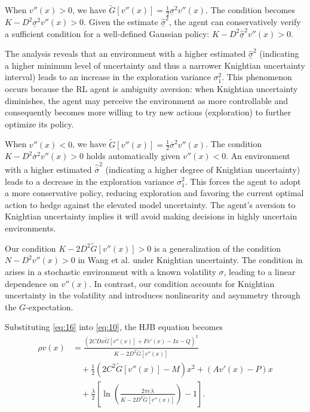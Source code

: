 \documentclass[onecolumn, journal]{IEEEtran} %
\begin{document}
	When $v''(x) > 0$, we have $\widetilde{G}[v''(x)] = \frac{1}{2} \underline{\sigma}^2 v''(x)$. The condition becomes $
	K - D^2 \underline{\sigma}^2 v''(x) > 0.$
	Given the estimate $\hat{\underline\sigma}^2$, the agent can conservatively verify a sufficient condition for a well-defined Gaussian policy: $
	K - D^2 \hat{\underline\sigma}^2v''(x) > 0.$
	
	The analysis reveals that an environment with a higher estimated $\hat{\underline\sigma}^2$ (indicating a higher minimum level of uncertainty and thus a narrower Knightian uncertainty interval) leads to an increase in the exploration variance $\sigma_1^2$. This phenomenon occurs because
	the RL agent is ambiguity aversion: when Knightian uncertainty
	diminishes, the agent may perceive the environment as
	more controllable and consequently becomes more willing to
	try new actions (exploration) to further optimize its policy.
	
	When $v''(x) < 0$, we have $\widetilde{G}[v''(x)] = \frac{1}{2} \overline{\sigma}^2 v''(x)$. The condition $ K - D^2 \overline{\sigma}^2 v''(x) > 0 $ holds automatically given $ v''(x) < 0 $. An environment with a higher estimated $\hat{\overline\sigma}^2$ (indicating a higher degree of Knightian uncertainty) leads to a decrease in the exploration variance $\sigma_1^2$. This forces the agent to adopt a more conservative policy, reducing exploration and favoring the current optimal action to hedge against the elevated model uncertainty. The agent’s aversion to Knightian uncertainty implies it will avoid making decisions in highly uncertain environments.
	
	Our condition $K - 2D^2 \widetilde{G}[v''(x)] > 0$ is a generalization of the condition $N - D^2 v''(x) > 0$ in Wang et al. \cite{wang2020reinforcement} under Knightian uncertainty. The condition in \cite{wang2020reinforcement} arises in a stochastic environment with a known volatility $\sigma$, leading to a linear dependence on $v''(x)$. In contrast, our condition accounts for Knightian uncertainty in the volatility and introduces nonlinearity and asymmetry through the $G$-expectation.
	
	Substituting \eqref{eq:16} into \eqref{eq:10},  the HJB equation becomes 
	\begin{equation}\label{eq:17}
		\begin{split}
			\rho v(x) &= \frac{(2CDx\widetilde{G}[v''(x)] + Fv'(x) - Ix - Q)^2}{K - 2D^2\widetilde{G}[v''(x)]} 
			\\
			&\quad+ \frac{1}{2}(2C^2\widetilde{G}[v''(x)] - M)x^2 
			+ (Av'(x) - P)x\\
			&\quad+ \frac{\lambda}{2} \left[ \ln \left( \frac{2\pi e\lambda}{K - 2D^2\widetilde{G}[v''(x)]} \right) - 1 \right].
		\end{split}
		\tag{17}
	\end{equation}
	
\end{document}
